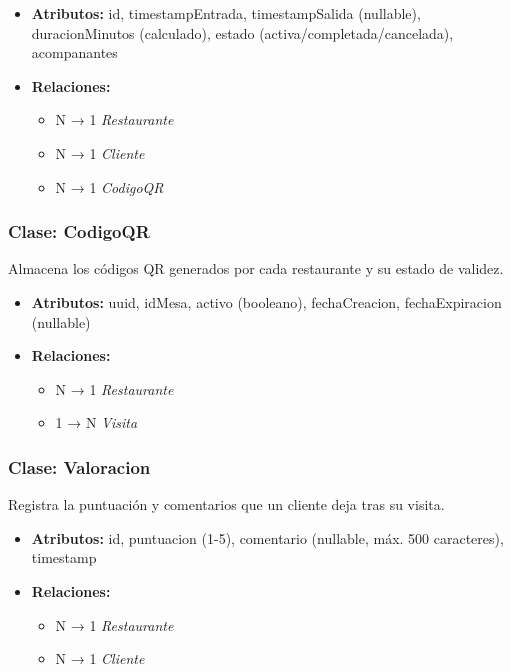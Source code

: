 \begin{itemize}
    \item \textbf{Atributos:} id, timestampEntrada, timestampSalida (nullable), duracionMinutos (calculado), estado (activa/completada/cancelada), acompanantes
    \item \textbf{Relaciones:}
    \begin{itemize}
        \item N → 1 \textit{Restaurante}
        \item N → 1 \textit{Cliente}
        \item N → 1 \textit{CodigoQR}
    \end{itemize}
\end{itemize}

\subsubsection{Clase: CodigoQR}
Almacena los códigos QR generados por cada restaurante y su estado de validez.

\begin{itemize}
    \item \textbf{Atributos:} uuid, idMesa, activo (booleano), fechaCreacion, fechaExpiracion (nullable)
    \item \textbf{Relaciones:}
    \begin{itemize}
        \item N → 1 \textit{Restaurante}
        \item 1 → N \textit{Visita}
    \end{itemize}
\end{itemize}

\subsubsection{Clase: Valoracion}
Registra la puntuación y comentarios que un cliente deja tras su visita.

\begin{itemize}
    \item \textbf{Atributos:} id, puntuacion (1-5), comentario (nullable, máx. 500 caracteres), timestamp
    \item \textbf{Relaciones:}
    \begin{itemize}
        \item N → 1 \textit{Restaurante}
        \item N → 1 \textit{Cliente}
    \end{itemize}
\end{itemize}

